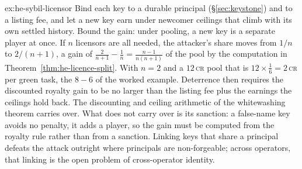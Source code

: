 \begin{pdsolution}{ex:he-sybil-licensor}
Bind each key to a durable principal (\S\ref{sec:keystone}) and to a
listing fee, and let a new key earn under newcomer ceilings that climb with
its own settled history. Bound the gain: under pooling, a new key is a separate player at once. If
$n$ licensors are all needed, the attacker's share moves from $1/n$ to
$2/(n+1)$, a gain of $\tfrac{2}{n+1}-\tfrac1n=\tfrac{n-1}{n(n+1)}$ of the
pool by the computation in Theorem~\ref{thm:he-licence-split}. With $n=2$ and a
$12$\,\textsc{cr} pool that is $12\times\tfrac16=2$\,\textsc{cr} per green
task, the $8-6$ of the worked example. Deterrence then requires the discounted
royalty gain to be no larger than the listing fee plus the earnings the
ceilings hold back. The discounting and ceiling arithmetic of the whitewashing
theorem carries over. What does not carry over is its sanction: a false-name
key avoids no penalty, it adds a player, so the gain must be computed from the
royalty rule rather than from a sanction. Linking keys that share a
principal defeats the attack outright where principals are non-forgeable;
across operators, that linking is the open problem of cross-operator identity.
\end{pdsolution}
